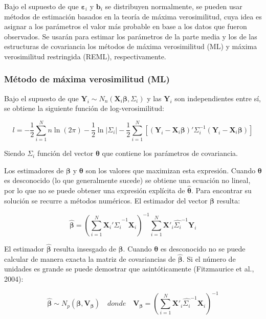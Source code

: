 \documentclass[spanish]{article}
\numberwithin{figure}{subsection}
\numberwithin{equation}{subsection}
\numberwithin{table}{subsection}
\begin{document}
Bajo el supuesto de que $\bm{\varepsilon}_i$ y $\bm{b}_i$ se distribuyen
normalmente, se pueden usar métodos de estimación basados en la teoría de máxima
verosimilitud, cuya idea es asignar a los parámetros el valor más probable en
base a los datos que fueron observados. Se usarán para estimar los parámetros de
la parte media y los de las estructuras de covariancia los métodos de máxima
verosimilitud (ML) y máxima verosimilitud restringida (REML), respectivamente.

\subsubsection{Método de máxima verosimilitud (ML)}

Bajo el supuesto de que $\bm{Y}_i \sim N_n(\bm{X}_i \bm{\beta},
\bm{\varSigma}_i)$ y las $\bm{Y}_i$
son independientes entre sí, se obtiene la siguiente función de
log-verosimilitud:

\begin{equation}
\label{ML}
	l = -\frac{1}{2} \sum_{i=1}^{N}n \ln(2\pi) - \frac{1}{2}\ln|\bm{\varSigma}_i| -
	\frac{1}{2} \sum_{i=1}^{N} [(\bm{Y}_i - \bm{X}_i\bm{\beta})'
	\bm{\varSigma}_i^{-1} (\bm{Y}_i - \bm{X}_i\bm{\beta})]
\end{equation}

Siendo $\bm{\varSigma}_i$ función del vector $\bm{\theta}$ que contiene los
parámetros de covariancia.

Los estimadores de $\bm{\beta}$ y $\bm{\theta}$ son los valores que maximizan
esta expresión. Cuando $\bm{\theta}$ es desconocido (lo que generalmente sucede)
se obtiene una ecuación no lineal, por lo que no se puede obtener una expresión
explícita de $\hat{\bm{\theta}}$. Para encontrar su solución se recurre a
métodos numéricos. El estimador del vector $\bm{\beta}$ resulta:

\[ \hat{\bm{\beta}} = (\sum_{i=1}^{N} \bm{X}_i'\hat{\bm{\varSigma}_i}^{-1}\bm{X}_i)^{-1}
\sum_{i=1}^{N} \bm{X}'_i\hat{\bm{\varSigma}_i}^{-1}\bm{Y}_i \]

El estimador $\hat{\bm{\beta}}$ resulta insesgado de $\bm{\beta}$. Cuando
$\bm{\theta}$ es desconocido no se puede calcular de manera exacta la matriz
de covariancias de $\hat{\bm{\beta}}$. Si el número de unidades es grande se
puede demostrar que asintóticamente (Fitzmaurice et al., 2004):

\[ \hat{\bm{\beta}} \sim N_p(\bm{\beta}, \bm{V}_{\bm{\beta}}) \quad donde \quad \bm{V}_{\bm{\beta}} =
(\sum_{i=1}^{N} \bm{X}'_i\hat{\bm{\varSigma}_i}^{-1}\bm{X}_i)^{-1} \]
\end{document}
